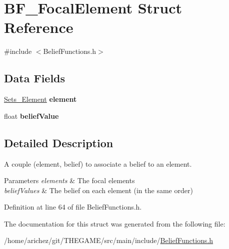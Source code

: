 \hypertarget{struct_b_f___focal_element}{\section{B\-F\-\_\-\-Focal\-Element Struct Reference}
\label{struct_b_f___focal_element}
}


{\ttfamily \#include $<$Belief\-Functions.\-h$>$}

\subsection*{Data Fields}
\begin{DoxyCompactItemize}
\item 
\hypertarget{struct_b_f___focal_element_a9a710ad49ddbc706371fa96ab1d1a4fa}{\hyperlink{struct_sets___element}{Sets\-\_\-\-Element} {\bfseries element}}\label{struct_b_f___focal_element_a9a710ad49ddbc706371fa96ab1d1a4fa}

\item 
\hypertarget{struct_b_f___focal_element_a59bb288073cdc2754b6d0ebc93b478d0}{float {\bfseries belief\-Value}}\label{struct_b_f___focal_element_a59bb288073cdc2754b6d0ebc93b478d0}

\end{DoxyCompactItemize}


\subsection{Detailed Description}
A couple (element, belief) to associate a belief to an element. 
\begin{DoxyParams}{Parameters}
{\em elements} & The focal elements \\
\hline
{\em belief\-Values} & The belief on each element (in the same order) \\
\hline
\end{DoxyParams}


Definition at line 64 of file Belief\-Functions.\-h.



The documentation for this struct was generated from the following file\-:\begin{DoxyCompactItemize}
\item 
/home/arichez/git/\-T\-H\-E\-G\-A\-M\-E/src/main/include/\hyperlink{_belief_functions_8h}{Belief\-Functions.\-h}\end{DoxyCompactItemize}
